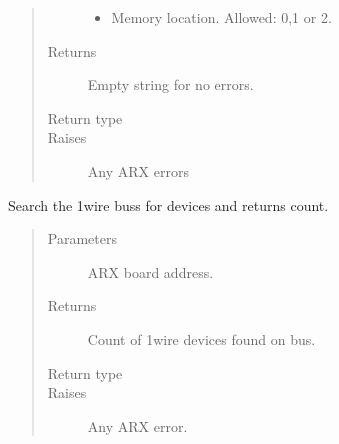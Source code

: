 \documentclass[letterpaper,10pt,english]{sphinxmanual}
\begin{document}
\begin{fulllineitems}
\begin{fulllineitems}
\begin{quote}
\begin{description}
\begin{itemize}
\item {} 
 \textendash{} Memory location. Allowed: 0,1 or 2.

\end{itemize}

\item[{Returns}] \leavevmode
Empty string for no errors.

\item[{Return type}] \leavevmode
{}

\item[{Raises}] \leavevmode
{} \textendash{} Any ARX errors

\end{description}\end{quote}

\end{fulllineitems}


\begin{fulllineitems}
\label{\detokenize{index:lwautils.lwa_arx.ARX.search_1wire}}
Search the 1wire buss for devices and returns count.
\begin{quote}\begin{description}
\item[{Parameters}] \leavevmode
{} \textendash{} ARX board address.

\item[{Returns}] \leavevmode
Count of 1wire devices found on bus.

\item[{Return type}] \leavevmode
{}

\item[{Raises}] \leavevmode
{} \textendash{} Any ARX error.

\end{description}\end{quote}

\end{fulllineitems}


\end{fulllineitems}
\end{document}
